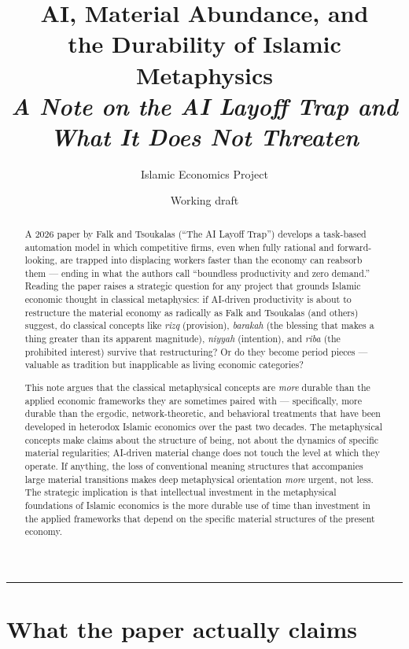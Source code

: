 \documentclass[11pt,a4paper]{article}
\title{
    \color{themegreen}\bfseries
    AI, Material Abundance, and\\[0.2em]
    the Durability of Islamic Metaphysics
    \\[0.5em]
    \large\color{themedark}\mdseries
    \itshape A Note on the AI Layoff Trap and What It Does Not Threaten
}
\author{Islamic Economics Project}
\date{Working draft}
\newcommand{\arb}[1]{\textit{#1}}
\begin{document}
\maketitle
\thispagestyle{empty}

\vspace{1em}
\begin{abstract}
\noindent A 2026 paper by Falk and Tsoukalas (``The AI Layoff Trap'')
develops a task-based automation model in which competitive firms,
even when fully rational and forward-looking, are trapped into
displacing workers faster than the economy can reabsorb them ---
ending in what the authors call ``boundless productivity and zero
demand.'' Reading the paper raises a strategic question for any
project that grounds Islamic economic thought in classical
metaphysics: if AI-driven productivity is about to restructure the
material economy as radically as Falk and Tsoukalas (and others)
suggest, do classical concepts like \arb{rizq} (provision),
\arb{barakah} (the blessing that makes a thing greater than its
apparent magnitude), \arb{niyyah} (intention), and \arb{riba} (the
prohibited interest) survive that restructuring? Or do they become
period pieces --- valuable as tradition but inapplicable as living
economic categories?

This note argues that the classical metaphysical concepts are
\textit{more} durable than the applied economic frameworks they are
sometimes paired with --- specifically, more durable than the
ergodic, network-theoretic, and behavioral treatments that have been
developed in heterodox Islamic economics over the past two decades.
The metaphysical concepts make claims about the structure of being,
not about the dynamics of specific material regularities; AI-driven
material change does not touch the level at which they operate. If
anything, the loss of conventional meaning structures that
accompanies large material transitions makes deep metaphysical
orientation \textit{more} urgent, not less. The strategic
implication is that intellectual investment in the metaphysical
foundations of Islamic economics is the more durable use of time
than investment in the applied frameworks that depend on the
specific material structures of the present economy.
\end{abstract}

\vspace{1em}
\hrule
\vspace{1em}

\section{What the paper actually claims}
\label{sec:paper-claims}
\end{document}
